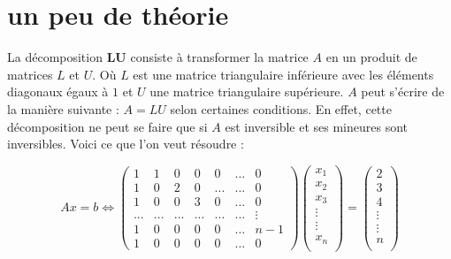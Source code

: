 \documentclass[10pt,a4paper]{article}
\begin{document}
\section{un peu de théorie}
\hypertarget{un peu de théorie}{}


La décomposition \textbf{LU} consiste à transformer la matrice $A$ en un produit de matrices $L$ et $U$. Où $L$ est une matrice triangulaire inférieure avec les éléments diagonaux égaux à $1$ et $U$ une matrice triangulaire supérieure. $A$ peut s'écrire de la manière suivante : $A=LU$ selon certaines conditions. En effet, cette décomposition ne peut se faire que si $A$ est inversible et ses mineures sont inversibles. Voici ce que l'on veut résoudre : 

$$Ax=b \Longleftrightarrow \begin{pmatrix}
1 & 1 & 0 & 0 & 0 & ... & 0\\
1 & 0 & 2 & 0 & ... & ... & 0\\
1 & 0 & 0 & 3 & 0 & ... & 0\\
... & ... & ... & ... & ... & ... & \vdots \\
1 & 0 & 0 & 0 & 0 & ... & n-1\\
1 & 0 & 0 & 0 & 0 & ... & 0
\end{pmatrix}
\left( \begin{array}{c}
x_{1} \\
x_{2} \\
x_{3} \\
\vdots \\
\vdots \\
x_{n} \\
\end{array} \right) 
=
\left( \begin{array}{c}
2 \\
3 \\
4 \\
\vdots \\
\vdots \\
n \\
\end{array} \right)
$$
\end{document}
